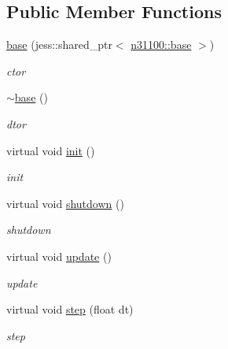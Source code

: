 \subsection*{Public Member Functions}
\begin{DoxyCompactItemize}
\item 
\hyperlink{classnebula_1_1content_1_1scene_1_1admin_1_1base_a415f430faa5437bfdabe26b23bbbe921}{base} (jess::shared\_\-ptr$<$ \hyperlink{classnebula_1_1content_1_1universe_1_1admin_1_1base}{n31100::base} $>$)
\begin{DoxyCompactList}\small\item\em ctor \item\end{DoxyCompactList}\item 
\hyperlink{classnebula_1_1content_1_1scene_1_1admin_1_1base_a5a4364ca7e8636c7c6345162b1fe9879}{$\sim$base} ()
\begin{DoxyCompactList}\small\item\em dtor \item\end{DoxyCompactList}\item 
virtual void \hyperlink{classnebula_1_1content_1_1scene_1_1admin_1_1base_a7d0a6e0325998166d84d4118634cd15d}{init} ()
\begin{DoxyCompactList}\small\item\em init \item\end{DoxyCompactList}\item 
virtual void \hyperlink{classnebula_1_1content_1_1scene_1_1admin_1_1base_a7c04c9e9d4790b004b68687468956173}{shutdown} ()
\begin{DoxyCompactList}\small\item\em shutdown \item\end{DoxyCompactList}\item 
virtual void \hyperlink{classnebula_1_1content_1_1scene_1_1admin_1_1base_a04559582f1549c9cece3c09de4016c24}{update} ()
\begin{DoxyCompactList}\small\item\em update \item\end{DoxyCompactList}\item 
virtual void \hyperlink{classnebula_1_1content_1_1scene_1_1admin_1_1base_af8961092528aad52d1a9414a29b26ffb}{step} (float dt)
\begin{DoxyCompactList}\small\item\em step \item\end{DoxyCompactList}\item 

\end{DoxyCompactItemize}
